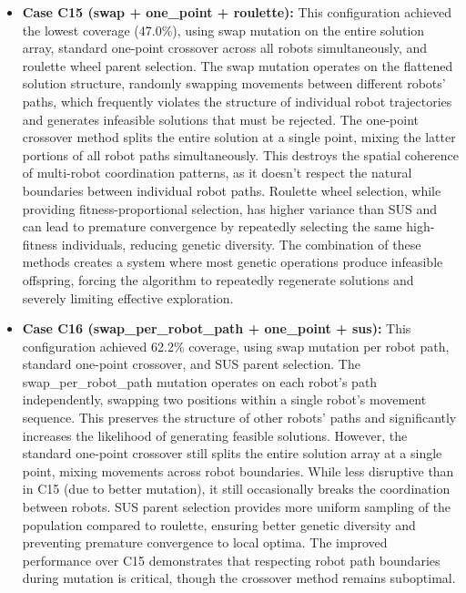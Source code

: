 \begin{itemize}
    \item \textbf{Case C15 (swap + one\_point + roulette):}
    This configuration achieved the lowest coverage (47.0\%), using swap mutation on the entire solution array, standard one-point crossover across all robots simultaneously, and roulette wheel parent selection.
    The swap mutation operates on the flattened solution structure, randomly swapping movements between different robots' paths, which frequently violates the structure of individual robot trajectories and generates infeasible solutions that must be rejected.
    The one-point crossover method splits the entire solution at a single point, mixing the latter portions of all robot paths simultaneously. This destroys the spatial coherence of multi-robot coordination patterns, as it doesn't respect the natural boundaries between individual robot paths.
    Roulette wheel selection, while providing fitness-proportional selection, has higher variance than SUS and can lead to premature convergence by repeatedly selecting the same high-fitness individuals, reducing genetic diversity.
    The combination of these methods creates a system where most genetic operations produce infeasible offspring, forcing the algorithm to repeatedly regenerate solutions and severely limiting effective exploration.

    \item \textbf{Case C16 (swap\_per\_robot\_path + one\_point + sus):}
    This configuration achieved 62.2\% coverage, using swap mutation per robot path, standard one-point crossover, and SUS parent selection.
    The swap\_per\_robot\_path mutation operates on each robot's path independently, swapping two positions within a single robot's movement sequence. This preserves the structure of other robots' paths and significantly increases the likelihood of generating feasible solutions.
    However, the standard one-point crossover still splits the entire solution array at a single point, mixing movements across robot boundaries. While less disruptive than in C15 (due to better mutation), it still occasionally breaks the coordination between robots.
    SUS parent selection provides more uniform sampling of the population compared to roulette, ensuring better genetic diversity and preventing premature convergence to local optima.
    The improved performance over C15 demonstrates that respecting robot path boundaries during mutation is critical, though the crossover method remains suboptimal.


\end{itemize}
